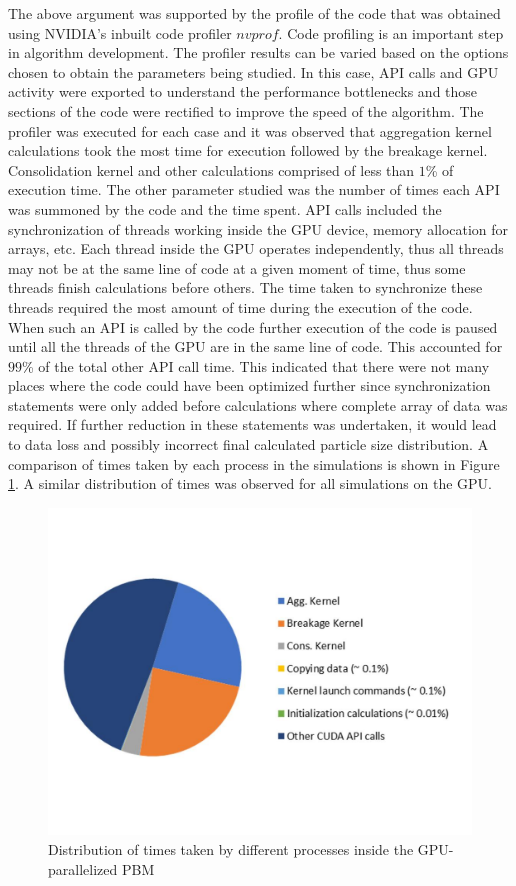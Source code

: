 \documentclass[preprint,10pt,authoryear,review]{elsarticle}
\begin{document}
\begin{linenumbers}
The above argument was supported by the profile of the code that was obtained using NVIDIA's
inbuilt code profiler $nvprof$. Code profiling is an important step in algorithm development. 
The profiler results can be varied based on the options chosen to obtain the parameters being 
studied. In this case, API calls and GPU activity were exported to understand the performance 
bottlenecks and those sections of the code were rectified to improve the speed of the algorithm.
The profiler was executed for each case and it was observed that aggregation kernel calculations 
took the most time for execution followed by the breakage kernel. Consolidation kernel 
and other calculations comprised of less than $1$\% of execution time. The other parameter 
studied was the number of times each API was summoned by the code and the time spent. API 
calls included the synchronization of threads working inside the GPU device, memory allocation 
for arrays, etc. Each thread inside the GPU operates independently,
thus all threads may not be at the same line of code at a given moment of time, thus some threads 
finish calculations before others. The time taken to synchronize these threads required the most 
amount of time during the execution of the code. When such an API is called by the code 
further execution of the code is paused until all the threads of the GPU are in the same 
line of code. This accounted for $99$\% of the total other API call time. This indicated that there 
were not many places where the code could have been optimized further since synchronization 
statements were only added before calculations where complete array of data was required. 
If further reduction in these statements was undertaken, it would lead to data loss and 
possibly incorrect final calculated particle size distribution. A comparison of times taken 
by each process in the simulations is shown in Figure \ref{fig:res_profile_pie}. A similar 
distribution of times was observed for all simulations on the GPU.

\begin{figure}[h]
\centering
\includegraphics[scale=0.4]{Profile_Pie-converted.pdf}
\caption{Distribution of times taken by different processes inside the GPU-parallelized 
PBM}
\label{fig:res_profile_pie}
\end{figure}



\end{linenumbers}
\end{document}
